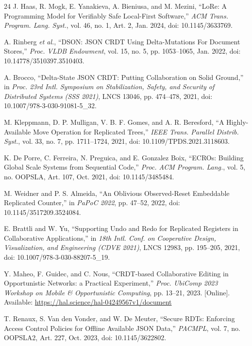 \documentclass[pdflatex,sn-mathphys-num]{sn-jnl}
\begin{document}
\begin{thebibliography}{24}
J. Haas, R. Mogk, E. Yanakieva, A. Bieniusa, and M. Mezini, ``LoRe: A Programming Model for Verifiably Safe Local-First Software,'' \textit{ACM Trans. Program. Lang. Syst.}, vol. 46, no. 1, Art. 2, Jan. 2024, doi: 10.1145/3633769.

A. Rinberg \textit{et al.}, ``DSON: JSON CRDT Using Delta-Mutations For Document Stores,'' \textit{Proc. VLDB Endowment}, vol. 15, no. 5, pp. 1053--1065, Jan. 2022, doi: 10.14778/3510397.3510403.

A. Brocco, ``Delta-State JSON CRDT: Putting Collaboration on Solid Ground,'' in \textit{Proc. 23rd Intl. Symposium on Stabilization, Safety, and Security of Distributed Systems (SSS 2021)}, LNCS 13046, pp. 474--478, 2021, doi: 10.1007/978-3-030-91081-5\_32.

M. Kleppmann, D. P. Mulligan, V. B. F. Gomes, and A. R. Beresford, ``A Highly-Available Move Operation for Replicated Trees,'' \textit{IEEE Trans. Parallel Distrib. Syst.}, vol. 33, no. 7, pp. 1711--1724, 2021, doi: 10.1109/TPDS.2021.3118603.

K. De Porre, C. Ferreira, N. Preguica, and E. Gonzalez Boix, ``ECROs: Building Global Scale Systems from Sequential Code,'' \textit{Proc. ACM Program. Lang.}, vol. 5, no. OOPSLA, Art. 107, Oct. 2021, doi: 10.1145/3485484.

M. Weidner and P. S. Almeida, ``An Oblivious Observed-Reset Embeddable Replicated Counter,'' in \textit{PaPoC 2022}, pp. 47--52, 2022, doi: 10.1145/3517209.3524084.

E. Brattli and W. Yu, ``Supporting Undo and Redo for Replicated Registers in Collaborative Applications,'' in \textit{18th Intl. Conf. on Cooperative Design, Visualization, and Engineering (CDVE 2021)}, LNCS 12983, pp. 195--205, 2021, doi: 10.1007/978-3-030-88207-5\_19.

Y. Maheo, F. Guidec, and C. Nous, ``CRDT-based Collaborative Editing in Opportunistic Networks: a Practical Experiment,'' \textit{Proc. UbiComp 2023 Workshop on Mobile \& Opportunistic Computing}, pp. 13--21, 2023. [Online]. Available: \url{https://hal.science/hal-04249567v1/document}

T. Renaux, S. Van den Vonder, and W. De Meuter, ``Secure RDTs: Enforcing Access Control Policies for Offline Available JSON Data,'' \textit{PACMPL}, vol. 7, no. OOPSLA2, Art. 227, Oct. 2023, doi: 10.1145/3622802.


\end{thebibliography}
\end{document}
